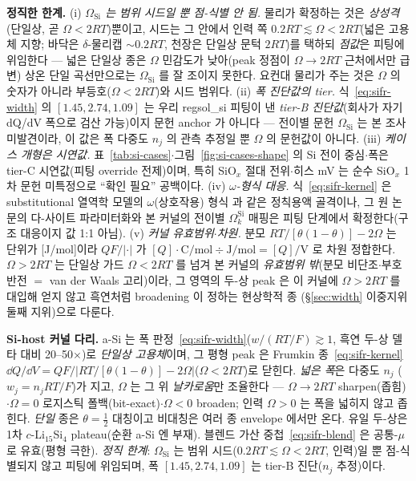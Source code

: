 \begin{warnbox}
\textbf{정직한 한계.} (i) \emph{$\Omega_\mathrm{Si}$ 는 범위 시드일 뿐 점-식별 안 됨.} 물리가 확정하는 것은
\emph{상성격}(단일상, 곧 $\Omega<2RT$)뿐이고, 시드는 그 안에서 인력 쪽 $0.2RT\lesssim\Omega<2RT$(넓은 고용체 지향;
바닥은 $\delta$-물리캡 $\sim0.2RT$, 천장은 단일상 문턱 $2RT$)를 택하되 \emph{점값}은 피팅에 위임한다 --- 넓은
단일상 종은 $\Omega$ 민감도가 낮아(peak 정점이 $\Omega{\to}2RT$ 근처에서만 급변) 상온 단일 곡선만으로는
$\Omega_\mathrm{Si}$ 를 잘 조이지 못한다. 요컨대 물리가 주는 것은 $\Omega$ 의 숫자가 아니라 부등호($\Omega<2RT$)와
시드 범위다. (ii) \emph{폭 진단값의 tier.} 식~\eqref{eq:sifr-width} 의 $[1.45,2.74,1.09]$ 는 우리 regsol\_si 피팅이
낸 \emph{tier-B 진단값}(회사가 자기 dQ/dV 폭으로 검산 가능)이지 문헌 anchor 가 아니다 --- 전이별 문헌
$\Omega_\mathrm{Si}$ 는 본 조사 미발견이라, 이 값은 폭 다중도 $n_j$ 의 관측 추정일 뿐 $\Omega$ 의 문헌값이 아니다.
(iii) \emph{케이스 개형은 시연값.} 표~\ref{tab:si-cases}$\cdot$그림~\ref{fig:si-cases-shape} 의 Si 전이 중심$\cdot$폭은
tier-C 시연값(피팅 override 전제)이며, 특히 SiO$_x$ 절대 전위$\cdot$히스 mV 는 순수 SiO$_x$ 1차 문헌 미특정으로
``확인 필요'' 공백이다. (iv) \emph{$\omega$-형식 대응.} 식~\eqref{eq:sifr-kernel} 은 substitutional 열역학 모델의
$\omega$(상호작용) 형식 \cite{verbrugge2017} 과 같은 정칙용액 골격이나, 그 원 논문의 다-사이트 파라미터화와 본
커널의 전이별 $\Omega_k^\mathrm{Si}$ 매핑은 피팅 단계에서 확정한다(구조 대응이지 값 1:1 아님). (v) \emph{커널
유효범위$\cdot$차원.} 분모 $RT/[\theta(1-\theta)]-2\Omega$ 는 단위가 [J/mol]이라 $QF/|\cdot|$ 가
$[Q]{\cdot}\mathrm{C/mol}\div\mathrm{J/mol}={[Q]}/\mathrm V$ 로 차원 정합한다. $\Omega>2RT$ 는 단일상 가드
$\Omega<2RT$ 를 넘겨 본 커널의 \emph{유효범위 밖}(분모 비단조$\cdot$부호 반전 $=$ van der Waals 고리)이라, 그
영역의 두-상 peak 은 이 커널에 $\Omega>2RT$ 를 대입해 얻지 않고 흑연처럼 broadening 이 정하는 현상학적 종
(\S\ref{sec:width} 이중지위 둘째 지위)으로 다룬다.
\end{warnbox}

\begin{keybox}
\textbf{Si-host 커널 다리.} a-Si 는 폭 판정~\eqref{eq:sifr-width}($w/(RT/F)\gtrsim1$, 흑연 두-상 델타 대비
20--50$\times$)로 \emph{단일상 고용체}이며, 그 평형 peak 은 Frumkin 종~\eqref{eq:sifr-kernel}
$\dd Q/\dd V=QF/|RT/[\theta(1-\theta)]-2\Omega|$($\Omega<2RT$)로 닫힌다. \emph{넓은 폭}은 다중도 $n_j$
($w_j{=}n_jRT/F$)가 지고, $\Omega$ 는 그 위 \emph{날카로움}만 조율한다 --- $\Omega{\to}2RT$ sharpen(좁힘)$\cdot\Omega{=}0$
로지스틱 폴백(bit-exact)$\cdot\Omega<0$ broaden; 인력 $\Omega{>}0$ 는 폭을 넓히지 않고 좁힌다. \emph{단일} 종은
$\theta{=}\tfrac12$ 대칭이고 비대칭은 여러 종 envelope 에서만 온다. 유일 두-상은 1차 $c$-Li$_{15}$Si$_4$
plateau(순환 a-Si 엔 부재). 블렌드 가산 중첩~\eqref{eq:sifr-blend} 은 공통-$\mu$ 로 유효(평형 극한).
\emph{정직 한계}: $\Omega_\mathrm{Si}$ 는 범위 시드($0.2RT\lesssim\Omega<2RT$, 인력)일 뿐 점-식별되지 않고
피팅에 위임되며, 폭 $[1.45,2.74,1.09]$ 는 tier-B 진단($n_j$ 추정)이다.
\end{keybox}

